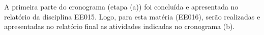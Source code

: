\documentclass[a4paper, 12pt]{article}
\begin{document}
A primeira parte do cronograma (etapa (a)) foi concluída e apresentada no relatório  da disciplina EE015. Logo, para esta matéria (EE016), serão realizadas e apresentadas no relatório final as atividades indicadas no cronograma (b).

\nocite{*}


\end{document}
